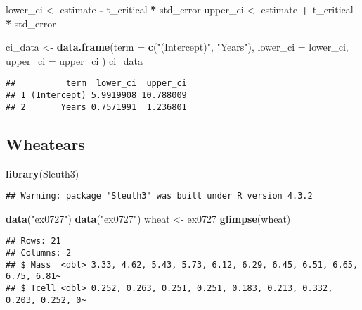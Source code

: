 \documentclass[
]{article}
\newenvironment{Shaded}{\begin{snugshade}}{\end{snugshade}}
\newcommand{\AttributeTok}[1]{\textcolor[rgb]{0.13,0.29,0.53}{#1}}
\newcommand{\FunctionTok}[1]{\textcolor[rgb]{0.13,0.29,0.53}{\textbf{#1}}}
\newcommand{\NormalTok}[1]{#1}
\newcommand{\OtherTok}[1]{\textcolor[rgb]{0.56,0.35,0.01}{#1}}
\newcommand{\SpecialCharTok}[1]{\textcolor[rgb]{0.81,0.36,0.00}{\textbf{#1}}}
\newcommand{\StringTok}[1]{\textcolor[rgb]{0.31,0.60,0.02}{#1}}
\begin{document}
\begin{enumerate}
\begin{Shaded}
\begin{Highlighting}[]
\NormalTok{lower\_ci }\OtherTok{\textless{}{-}}\NormalTok{ estimate }\SpecialCharTok{{-}}\NormalTok{ t\_critical }\SpecialCharTok{*}\NormalTok{ std\_error}
\NormalTok{upper\_ci }\OtherTok{\textless{}{-}}\NormalTok{ estimate }\SpecialCharTok{+}\NormalTok{ t\_critical }\SpecialCharTok{*}\NormalTok{ std\_error}

\NormalTok{ci\_data }\OtherTok{\textless{}{-}} \FunctionTok{data.frame}\NormalTok{(}\AttributeTok{term =} \FunctionTok{c}\NormalTok{(}\StringTok{"(Intercept)"}\NormalTok{, }\StringTok{"Years"}\NormalTok{),}
                      \AttributeTok{lower\_ci =}\NormalTok{ lower\_ci,}
                      \AttributeTok{upper\_ci =}\NormalTok{ upper\_ci}
\NormalTok{                      )}
\NormalTok{ci\_data}
\end{Highlighting}
\end{Shaded}

\begin{verbatim}
##          term  lower_ci  upper_ci
## 1 (Intercept) 5.9919908 10.788009
## 2       Years 0.7571991  1.236801
\end{verbatim}
\end{enumerate}

\hypertarget{wheatears}{%
\subsection{Wheatears}\label{wheatears}}

\begin{Shaded}
\begin{Highlighting}[]
\FunctionTok{library}\NormalTok{(Sleuth3)}
\end{Highlighting}
\end{Shaded}

\begin{verbatim}
## Warning: package 'Sleuth3' was built under R version 4.3.2
\end{verbatim}

\begin{Shaded}
\begin{Highlighting}[]
\FunctionTok{data}\NormalTok{(}\StringTok{"ex0727"}\NormalTok{)}
\FunctionTok{data}\NormalTok{(}\StringTok{"ex0727"}\NormalTok{)}
\NormalTok{wheat }\OtherTok{\textless{}{-}}\NormalTok{ ex0727}
\FunctionTok{glimpse}\NormalTok{(wheat)}
\end{Highlighting}
\end{Shaded}

\begin{verbatim}
## Rows: 21
## Columns: 2
## $ Mass  <dbl> 3.33, 4.62, 5.43, 5.73, 6.12, 6.29, 6.45, 6.51, 6.65, 6.75, 6.81~
## $ Tcell <dbl> 0.252, 0.263, 0.251, 0.251, 0.183, 0.213, 0.332, 0.203, 0.252, 0~
\end{verbatim}
\end{document}
